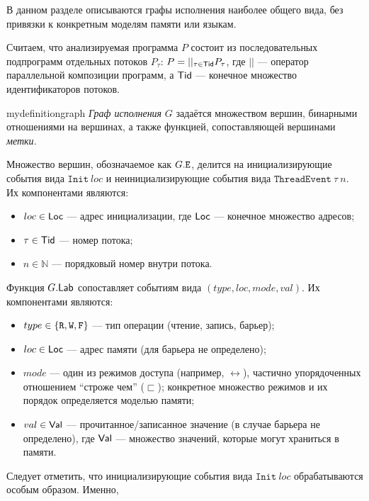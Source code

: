 \documentclass[14pt]{matmex-diploma-custom}
\begin{document}
В данном разделе описываются графы исполнения наиболее общего вида, без привязки к конкретным моделям памяти или языкам. 

Считаем, что анализируемая программа $P$ состоит из последовательных подпрограмм отдельных потоков $P_\tau$: $P = ||_{\tau\in \mathsf{Tid}} P_\tau$, где $||$ --- оператор параллельной композиции программ, а $\mathsf{Tid}$ --- конечное множество идентификаторов потоков.

\begin{restatable}{mydefinition}{graph}
  \emph{Граф исполнения} $G$ задаётся множеством вершин, бинарными отношениями на вершинах, а также функцией, сопоставляющей вершинами \emph{метки}. 
\end{restatable}
  
  Множество вершин, обозначаемое как $G.{\mathtt{E}}$, делится на инициализирующие события вида $\mathtt{Init}\ loc$ и неинициализирующие события вида $\mathtt{ThreadEvent}\ \tau\ n$. Их компонентами являются:
  \begin{itemize}
  \item $loc \in \mathsf{Loc}$ --- адрес инициализации, где $\mathsf{Loc}$ --- конечное множество адресов;
  \item $\tau \in \mathsf{Tid}$ --- номер потока;
  \item $n\in \mathbb{N}$ --- порядковый номер внутри потока.
  \end{itemize}
    
Функция $G.\mathsf{Lab}$ сопоставляет событиям  вида $(type, loc, mode, val)$. Их компонентами являются:
\begin{itemize}
\item $type \in \{{\mathtt{R}}, {\mathtt{W}}, {\mathtt{F}}\}$ --- тип операции (чтение, запись, барьер);
\item $loc \in \mathsf{Loc}$ --- адрес памяти (для барьера не определено);
\item $mode$ --- один из режимов доступа (например, $\rel$), частично упорядоченных отношением ``строже чем'' ($\sqsubset$); конкретное множество режимов и их порядок определяется моделью памяти;
\item $val\in \mathsf{Val}$ --- прочитанное/записанное значение (в случае барьера не определено), где $\mathsf{Val}$ --- множество значений, которые могут храниться в памяти.
\end{itemize}

Следует отметить, что инициализирующие события вида $\mathtt{Init}\ loc$ обрабатываются особым образом. Именно,
\end{document}

